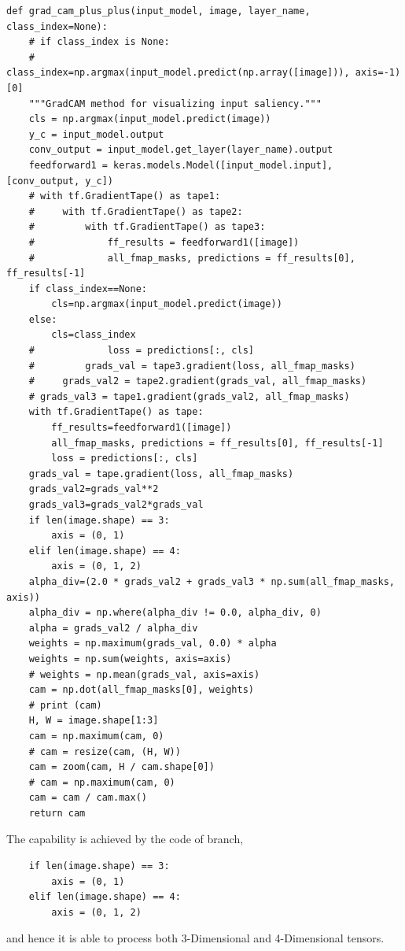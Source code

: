 \documentclass[conference]{IEEEtran}
\begin{document}
\begin{lstlisting}
def grad_cam_plus_plus(input_model, image, layer_name, class_index=None):
    # if class_index is None:
    #     class_index=np.argmax(input_model.predict(np.array([image])), axis=-1)[0]
    """GradCAM method for visualizing input saliency."""
    cls = np.argmax(input_model.predict(image))
    y_c = input_model.output
    conv_output = input_model.get_layer(layer_name).output
    feedforward1 = keras.models.Model([input_model.input], [conv_output, y_c])
    # with tf.GradientTape() as tape1:
    #     with tf.GradientTape() as tape2:
    #         with tf.GradientTape() as tape3:
    #             ff_results = feedforward1([image])
    #             all_fmap_masks, predictions = ff_results[0], ff_results[-1]
    if class_index==None:
        cls=np.argmax(input_model.predict(image))
    else:
        cls=class_index
    #             loss = predictions[:, cls]
    #         grads_val = tape3.gradient(loss, all_fmap_masks)
    #     grads_val2 = tape2.gradient(grads_val, all_fmap_masks)
    # grads_val3 = tape1.gradient(grads_val2, all_fmap_masks)
    with tf.GradientTape() as tape:
        ff_results=feedforward1([image])
        all_fmap_masks, predictions = ff_results[0], ff_results[-1]
        loss = predictions[:, cls]
    grads_val = tape.gradient(loss, all_fmap_masks)
    grads_val2=grads_val**2
    grads_val3=grads_val2*grads_val
    if len(image.shape) == 3:
        axis = (0, 1)
    elif len(image.shape) == 4:
        axis = (0, 1, 2)
    alpha_div=(2.0 * grads_val2 + grads_val3 * np.sum(all_fmap_masks, axis))
    alpha_div = np.where(alpha_div != 0.0, alpha_div, 0)
    alpha = grads_val2 / alpha_div
    weights = np.maximum(grads_val, 0.0) * alpha
    weights = np.sum(weights, axis=axis)
    # weights = np.mean(grads_val, axis=axis)
    cam = np.dot(all_fmap_masks[0], weights)
    # print (cam)
    H, W = image.shape[1:3]
    cam = np.maximum(cam, 0)
    # cam = resize(cam, (H, W))
    cam = zoom(cam, H / cam.shape[0])
    # cam = np.maximum(cam, 0)
    cam = cam / cam.max()
    return cam
\end{lstlisting}

The capability is achieved by the code of branch,
\begin{lstlisting}
    if len(image.shape) == 3:
        axis = (0, 1)
    elif len(image.shape) == 4:
        axis = (0, 1, 2)
\end{lstlisting}
and hence it is able to process both 3-Dimensional and 4-Dimensional tensors.
\end{document}
